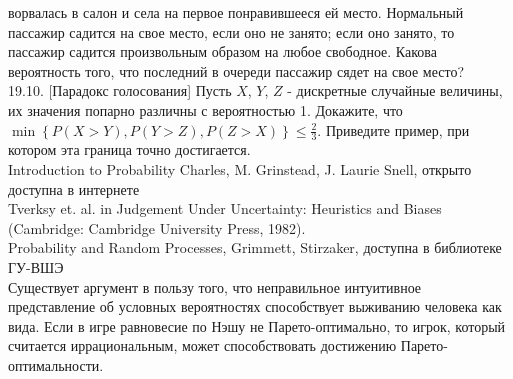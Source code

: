 \documentclass[pdftex,12pt,a4paper]{article}
\begin{document}
ворвалась в салон и села на первое понравившееся ей место.
Нормальный пассажир садится на свое место, если оно не занято;
если оно занято, то пассажир садится произвольным образом на любое
свободное. Какова вероятность того,
что последний в очереди пассажир сядет на свое место? \\
19.10. [Парадокс голосования] Пусть $X$, $Y$, $Z$ - дискретные
случайные величины, их значения попарно различны с вероятностью 1.
Докажите, что \\
$\min\left\{P(X>Y),P(Y>Z),P(Z>X)\right\}\le
\frac{2}{3}$.
Приведите пример, при котором эта граница точно достигается. \\
Introduction to Probability Charles, M.
Grinstead, J. Laurie Snell, открыто доступна в интернете \\
Tverksy et. al. in Judgement Under Uncertainty: Heuristics and
Biases (Cambridge: Cambridge University Press,
1982). \\
Probability and Random Processes, Grimmett, Stirzaker, доступна в
библиотеке ГУ-ВШЭ \\
Существует аргумент в пользу того, что неправильное интуитивное
представление об условных вероятностях способствует выживанию
человека как вида. Если в игре равновесие по Нэшу не
Парето-оптимально, то игрок, который считается иррациональным,
может способствовать достижению Парето-оптимальности. \\
\end{document}
